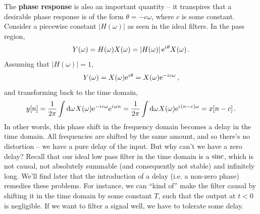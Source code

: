 %
The \textbf{phase response} is also an important quantity -- it transpires that
a desirable phase response is of the form $\theta = -c\omega$, where $c$ is some
constant. Consider a piecewise constant $\left|H(\omega)\right|$ as seen in
the ideal filters. In the pass region,
%
\begin{displaymath}
  Y(\omega) = H(\omega)X(\omega) = \left|H(\omega)\right|\mathrm{e}^{{i\mkern1mu}\theta}X(\omega) \,.
\end{displaymath}
%
Assuming that $|H(\omega)| = 1$,
%
\begin{displaymath}
  Y(\omega) = X(\omega)\mathrm{e}^{{i\mkern1mu}\theta} = X(\omega)\mathrm{e}^{-{i\mkern1mu} c\omega} \,,
\end{displaymath}
%
and transforming back to the time domain,
%
\begin{displaymath}
  y[n] = \frac{1}{2\pi}\int\mathrm{d}\omega\mkern1muX(\omega)\mathrm{e}^{-{i\mkern1mu} c\omega}\mathrm{e}^{{i\mkern1mu}\omega n}
  = \frac{1}{2\pi}\int\mathrm{d}\omega\mkern1muX(\omega)\mathrm{e}^{{i\mkern1mu}(n - c)\omega} = x[n-c] \,.
\end{displaymath}
%
In other words, this phase shift in the frequency domain becomes a delay in
the time domain. All frequencies are shifted by the same amount, and
so there's no distortion -- we have a pure delay of the input. But why can't we
have a zero delay? Recall that our ideal low pass filter in the time domain is
a $\operatorname{sinc}$, which is not causal, not absolutely summable (and consequently
not stable) and infinitely long. We'll find later that the introduction of a
delay (i.e. a non-zero phase) remedies these problems. For instance, we can
``kind of'' make the filter causal by shifting it in the time domain by some
constant $T$, such that the output at $t < 0$  is negligible. If we want to filter
a signal well, we have to tolerate some delay.
